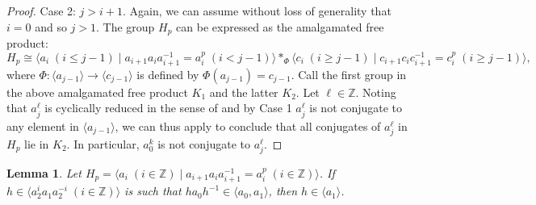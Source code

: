 \documentclass[11pt]{amsart}
\newtheorem{lem}[theorem]{Lemma}
\theoremstyle{definition}
\numberwithin{theorem}{section}
\newcommand{\Z}{\mathbb{Z}}
\begin{document}
\begin{proof}
	Case 2: \(j > i + 1\). Again, we can assume without loss of generality that
	\(i = 0\) and so \(j > 1\). The group \(H_p\)
	can be expressed as the amalgamated free product:
	\[
		H_p \cong \langle a_i \; (i \leq j - 1) \mid a_{i + 1} a_i a_{i + 1}^{-1} = a_i^p 
		\; (i < j - 1) \rangle \ast_{\Phi} 
		\langle c_i \; (i \geq j - 1) \mid c_{i + 1} c_i c_{i + 1}^{-1} = c_i^p
		\; (i \geq j - 1) \rangle,
	\]
	where \(\Phi \colon \langle a_{j - 1} \rangle \to \langle c_{j -1}
	\rangle\) is defined by \(\Phi(a_{j - 1}) = c_{j - 1}\). Call the first
	group in the above amalgamated free product \(K_1\) and the latter \(K_2\).
	Let \(\ell \in \Z\).  Noting that \(a_j^\ell\) is cyclically reduced in the
	sense of \cite[Theorem 4.6]{MagnusKarrassSolitar} and by Case 1
	\(a_j^\ell\) is not conjugate to any element in \(\langle a_{j - 1}
	\rangle\), we can thus apply \cite[Theorem 4.6(ii)]{MagnusKarrassSolitar}
	to conclude that all conjugates of \(a_j^\ell\) in \(H_p\) lie in \(K_2\).
	In particular, \(a_0^k\) is not conjugate to \(a_j^\ell\).
\end{proof}

\begin{lem}
		\label{conj-into-ab}
		Let \(H_p = \langle a_i \; (i \in \Z) \mid a_{i + 1} a_i a_{i + 1}^{-1} 
		= a_i^p \; (i \in \Z)\rangle\). If \(h \in \langle a_2^i a_1 a_2^{-i} \;
		(i \in \Z) \rangle\) is such that \(h a_0 h^{-1} \in \langle a_0, a_1
		\rangle\), then \(h \in \langle a_1 \rangle\).
\end{lem}
\end{document}
